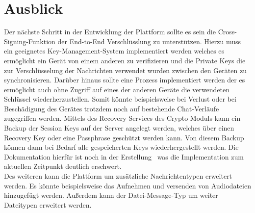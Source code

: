     \chapter{Ausblick}\label{ch:ausblick}
    Der nächste Schritt in der Entwicklung der Plattform sollte es sein die Cross-Signing-Funktion der End-to-End Verschlüsslung zu unterstützen.
    Hierzu muss ein geeignetes Key-Management-System implementiert werden welches es ermöglicht ein Gerät von einem anderen zu verifizieren und die Private Keys die zur Verschlüsselung der Nachrichten verwendet wurden zwischen den Geräten zu synchronisieren.
    Darüber hinaus sollte eine Prozess implementiert werden der es ermöglicht auch ohne Zugriff auf eines der anderen Geräte die verwendeten Schlüssel wiederherzustellen.
    Somit könnte beispielsweise bei Verlust oder bei Beschädigung des Gerätes trotzdem noch auf bestehende Chat-Verläufe zugegriffen werden.
    Mittels des Recovery Services des Crypto Moduls kann ein Backup der Session Keys auf der Server angelegt werden, welches über einen Recovery Key oder eine Passphrase geschützt werden kann.
    Von diesem Backup können dann bei Bedarf alle gespeicherten Keys wiederhergestellt werden.
    Die Dokumentation hierfür ist noch in der Erstellung~\cite{advancede2e} was die Implementation zum aktuellen Zeitpunkt deutlich erschwert.\\
    Des weiteren kann die Plattform um zusätzliche Nachrichtentypen erweitert werden.
    Es könnte beispielsweise das Aufnehmen und versenden von Audiodateien hinzugefügt werden.
    Außerdem kann der Datei-Message-Typ um weiter Dateitypen erweitert werden.

%

%

%

    \backmatter
    \listoffigures

    
    

    \appendix





%
%